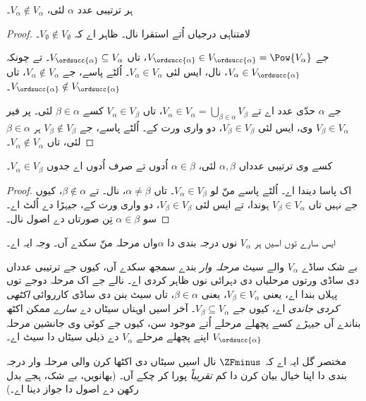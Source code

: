 \documentclass[../../../include/open-logic-section]{subfiles}
\begin{document}
\begin{lem}
ہر ترتیبی عدد $\alpha$ لئی، $V_\alpha \notin V_\alpha$۔
\end{lem}

\begin{proof}
لامتناہی درجیاں اُتے استقرا نال۔ ظاہر اے کہ $V_\emptyset \notin V_\emptyset$۔

جے $V_{\ordsucc{\alpha}} \in V_{\ordsucc{\alpha}} = \Pow{V_\alpha}$،
تاں $V_{\ordsucc{\alpha}} \subseteq V_\alpha$۔ تے چونکہ
$V_\alpha \in V_{\ordsucc{\alpha}}$،  نال،
ایس لئی $V_\alpha \in V_\alpha$۔ اُلٹے پاسے، جے $V_\alpha \notin V_\alpha$،
تاں $V_{\ordsucc{\alpha}} \notin V_{\ordsucc{\alpha}}$۔

جے $\alpha$ حدّی عدد اے تے $V_\alpha \in V_\alpha = \bigcup_{\beta \in \alpha}V_\beta$،
تاں $V_\alpha \in V_\beta$ کسے $\beta \in \alpha$ لئی۔ پر فیر
$V_\beta \in V_\alpha$ وی، ایس لئی $V_\beta \in V_\beta$،
 دو واری ورت کے۔ اُلٹے پاسے، جے $V_\beta
\notin V_\beta$ ہر $\beta \in \alpha$ لئی، تاں $V_\alpha \notin V_\alpha$۔
\end{proof}

\begin{cor}
کسے وی ترتیبی عدداں $\alpha, \beta$ لئی، $\alpha \in \beta$ اُدوں
تے صرف اُدوں اے جدوں $V_\alpha \in V_\beta$۔
\end{cor}

\begin{proof}
 اک پاسا دیندا اے۔ اُلٹے پاسے منّ لو
$V_\alpha \in V_\beta$۔ تاں $\alpha \neq \beta$، 
نال۔ تے $\beta \notin \alpha$، کیوں جے نہیں تاں $V_\beta \in V_\alpha$
ہوندا، تے ایس لئی $V_\beta \in V_\beta$، 
دو واری ورت کے، جیہڑا  دے اُلٹ اے۔
سو $\alpha \in \beta$ تِن صورتاں دے اصول نال۔
\end{proof}
\noindent
ایس سارے توں اسیں ہر $V_\alpha$ نوں درجہ بندی دا $\alpha$واں مرحلہ
منّ سکدے آں۔ وجہ ایہ اے۔

بے شک ساڈے $V_\alpha$ والے سیٹ \emph{مرحلہ وار} بندے سمجھ سکدے آں، کیوں جے
ترتیبی عدداں دی ساڈی ورتوں مرحلیاں دی دہرائی نوں ظاہر کردی اے۔ نالے جے اک
مرحلہ دوجے توں پہلاں بندا اے، یعنی $V_\beta \in V_\alpha$، یعنی $\beta \in \alpha$،
تاں سیٹ بنن دی ساڈی کارروائی \emph{اکٹھی کردی جاندی} اے، کیوں جے
$V_\beta \subseteq V_\alpha$۔ آخر اسیں اوہناں سیٹاں دے \emph{سارے} ممکن
اکٹھ بناندے آں جیہڑے کسے پچھلے مرحلے اُتے موجود سن، کیوں جے کوئی وی
جانشین مرحلہ $V_{\ordsucc{\alpha}}$ اپنے پچھلے مرحلے $V_\alpha$ دے ذیلی سیٹاں
دا سیٹ اے۔

مختصر گل ایہ اے کہ $\ZFminus$ نال اسیں سیٹاں دی اکٹھا کرن والی مرحلہ وار
درجہ بندی دا اپنا خیال بیان کرن دا کم \emph{تقریباً} پورا کر چکے آں۔
(بھانویں، بے شک، ہجے بدل رکھن دے اصول دا جواز دینا اے۔)
\end{document}
